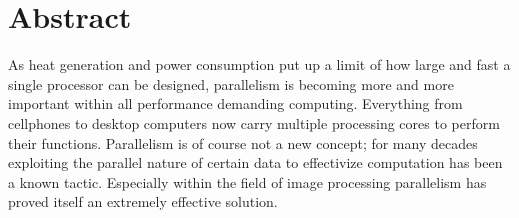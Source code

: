 \begingroup
\let\clearpage\relax
\let\cleardoublepage\relax
\let\cleardoublepage\relax

\chapter*{Abstract}





As heat generation and power consumption put up a limit of how large and fast a
single processor can be designed, parallelism is becoming more and more
important within all performance demanding computing. Everything from cellphones
to desktop computers now carry multiple processing cores to perform their
functions. Parallelism is of course not a new concept; for many decades
exploiting the parallel nature of certain data to effectivize computation has
been a known tactic. Especially within the field of image processing parallelism
has proved itself an extremely effective solution.

